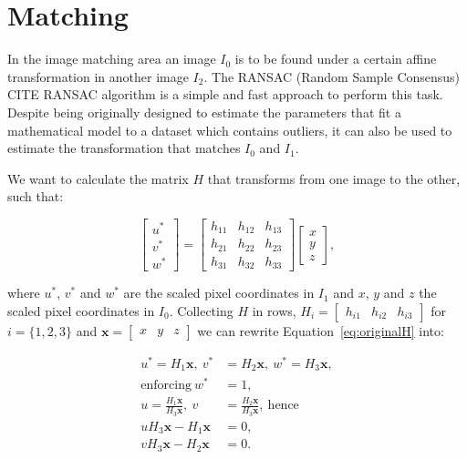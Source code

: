 \documentclass[12pt]{article}
\begin{document}
\FloatBarrier %
\section{Matching}

In the image matching area an image $I_0$ is to be found under a certain affine transformation in another image $I_2$.
The RANSAC (Random Sample Consensus) CITE RANSAC algorithm is a simple and fast approach to perform this task.
Despite being originally designed to estimate the parameters that fit a mathematical model to a dataset which contains outliers, it can also be used to estimate the transformation that matches $I_0$ and $I_1$.

We want to calculate the matrix $H$ that transforms from one image to the other, such that:

\begin{equation}
\begin{bmatrix}
u^* \\ 
v^* \\ 
w^*
\end{bmatrix}
= 
\begin{bmatrix}
 h_{11} & h_{12} & h_{13} \\ 
 h_{21} & h_{22} & h_{23}\\ 
 h_{31} & h_{32} & h_{33}
\end{bmatrix}
\begin{bmatrix}
x \\
y \\
z
\end{bmatrix},
\label{eq:originalH}
\end{equation}

where $u^*$, $v^*$ and $w^*$ are the scaled pixel coordinates in $I_1$ and $x$, $y$ and $z$ the scaled pixel coordinates in $I_0$.
Collecting $H$ in rows, $H_i = \begin{bmatrix} h_{i1} & h_{i2} & h_{i3} \end{bmatrix}$ for $i = \lbrace 1,2,3 \rbrace$ and $\mathbf{x} = \begin{bmatrix} x & y & z \end{bmatrix}$ we can rewrite Equation~\ref{eq:originalH} into:

\begin{equation}
\begin{aligned}
	u^* = H_1 \mathbf{x}, \: v^* &= H_2 \mathbf{x}, \: w^* = H_3 \mathbf{x}, \\ 
	\text{enforcing} \: w^* &= 1, \\
	u = \frac{H_1 \mathbf{x}}{ H_3 \mathbf{x}}, \: v &= \frac{H_2 \mathbf{x}}{ H_3 \mathbf{x}}, \: \text{hence} \\
	uH_3\mathbf{x} - H_1\mathbf{x} &= 0, \\
	vH_3\mathbf{x} - H_2\mathbf{x} &= 0.
\end{aligned}
\end{equation}
\end{document}
